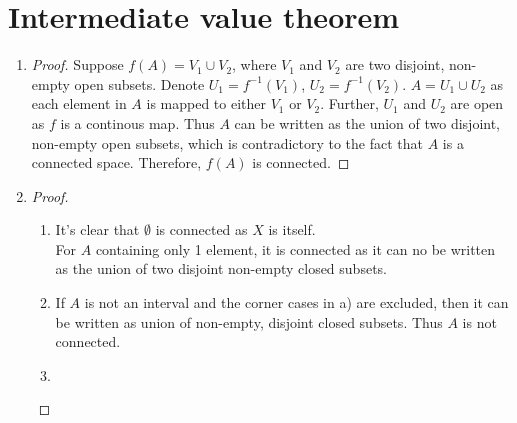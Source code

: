 \documentclass[paper=a4, fontsize=11pt]{scrartcl} %
\numberwithin{equation}{section} %
\numberwithin{figure}{section} %
\numberwithin{table}{section} %
\begin{document}
\section{Intermediate value theorem}

\begin{enumerate}
	\item
      \begin{proof}
      	Suppose $f(A) = V_1 \cup V_2$, where $V_1$ and $V_2$ are two disjoint, non-empty open subsets.
      	Denote $U_1 = f^{-1}(V_1)$, $U_2 = f^{-1}(V_2)$. $A = U_1 \cup U_2$ as each element in $A$ is mapped to either $V_1$ or $V_2$.
      	Further, $U_1$ and $U_2$ are open as $f$ is a continous map. 
      	Thus $A$ can be written as the union of two disjoint, non-empty open subsets, which is contradictory to the fact that $A$ is a connected space. Therefore, $f(A)$ is connected.
      \end{proof}
  
	\item
	  \begin{proof}
		\begin{enumerate}
			\item
				It's clear that $\emptyset$ is connected as $X$ is itself.\\
				For $A$ containing only 1 element, it is connected as it can no be written as the union of two disjoint non-empty closed subsets.
			\item
				If $A$ is not an interval and the corner cases in a) are excluded, then it can be written as union of non-empty, disjoint closed subsets. Thus $A$ is not connected.
			\item 
				
		\end{enumerate}
	  \end{proof}
  
\end{enumerate}


\end{document}
